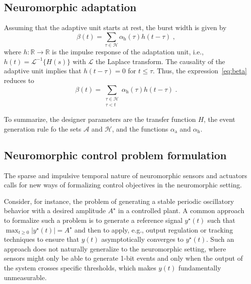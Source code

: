 \documentclass{article}
\newcommand{\AC}{\mathcal{A}}
\newcommand{\HH}{\mathcal{H}}
\newcommand{\RR}{\mathbb{R}}
\newcommand{\ra}{\mathrm{a}}
\newcommand{\rh}{\mathrm{h}}
\theoremstyle{definition}
\theoremstyle{remark}
\begin{document}


\subsection{Neuromorphic adaptation}

Assuming that the adaptive unit starts at rest, the burst width is given by
\begin{equation} \label{eq:beta}
    \beta(t) = \sum_{\tau \in \HH}\alpha_\rh(\tau)h(t-\tau) \;,
\end{equation}
where $h : \RR \to \RR$ is the impulse response of the adaptation unit, i.e., $h(t) = \mathcal{L}^{-1}\{H(s)\}$ with $\mathcal{L}$ the Laplace transform. The causality of the adaptive unit implies that $h(t-\tau) = 0$ for $t \le \tau$. Thus, the expression~\eqref{eq:beta} reduces to
\begin{equation} \label{eq:beta_causal}
    \beta(t) = \sum_{\substack{\tau \in \HH \\ \tau < t}}\alpha_\rh(\tau)h(t-\tau) \;.
\end{equation}

To summarize, the designer parameters are the transfer function $H$, the event generation rule fo the sets $\AC$ and $\HH$, and the functions $\alpha_\ra$ and $\alpha_\rh$.

\subsection{Neuromorphic control problem formulation}

The sparse and impulsive temporal nature of neuromorphic sensors and actuators calls for new ways of formalizing control objectives in the neuromorphic setting. 

Consider, for instance, the problem of generating a stable periodic oscillatory behavior with a desired amplitude $A^\star$ in a controlled plant. A common approach~\cite{pasandi2022integrated,ijspeert2007swimming} to formalize such a problem is to generate a reference signal $y^\star(t)$ such that $\max_{t\geq0}|y^\star(t)|=A^\star$ and then to apply, e.g., output regulation or tracking techniques to ensure that $y(t)$ asymptotically converges to $y^\star(t)$. Such an approach does not naturally generalize to the neuromorphic setting, where sensors might only be able to generate 1-bit events and only when the output of the system crosses specific thresholds, which makes $y(t)$ fundamentally unmeasurable.
\end{document}
